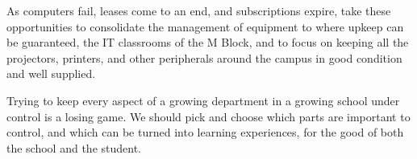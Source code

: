 \documentclass[a4paper,leqno,titlepage]{article}
\begin{document}
As computers fail, leases come to an end, and subscriptions expire,
take these opportunities to consolidate the management of equipment to where
upkeep can be guaranteed, the IT classrooms of the M Block,
and to focus on keeping all the projectors, printers, and other peripherals
around the campus in good condition and well supplied.

Trying to keep every aspect of a growing department in a growing school
under control is a losing game. We should pick and choose which parts
are important to control, and which can be turned into learning experiences,
for the good of both the school and the student.
\end{document}
